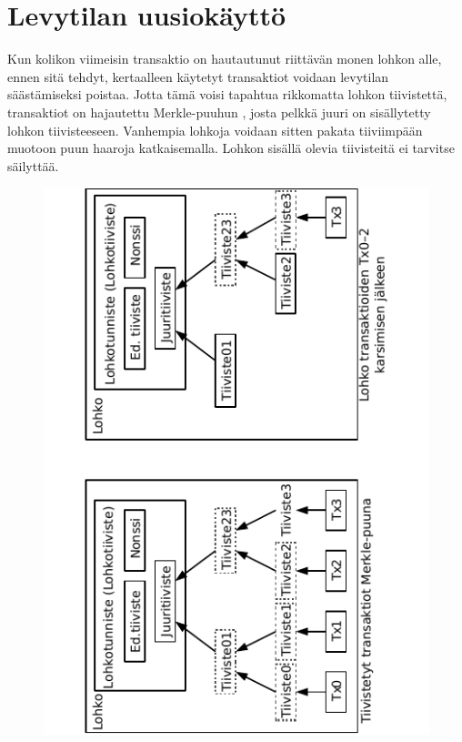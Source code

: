 \documentclass{article}
\begin{document}
\section{Levytilan uusiokäyttö}

Kun kolikon viimeisin transaktio on hautautunut riittävän monen lohkon alle, ennen sitä tehdyt, kertaalleen käytetyt transaktiot voidaan levytilan sääs\-tä\-mi\-sek\-si poistaa. Jotta tämä voisi tapahtua rikkomatta lohkon tiivistettä, transaktiot on hajautettu Merkle-puuhun \cite{7}\cite{2}\cite{5}, josta pelkkä juuri on sisällytetty lohkon tiivisteeseen. Vanhempia lohkoja voidaan sitten pakata tiiviimpään muotoon puun haaroja katkaisemalla. Lohkon sisällä olevia tiivisteitä ei tarvitse säilyttää.

\begin{figure}[H]
    \centering
    \includegraphics[angle=270,width=\textwidth]{figures/fig4.pdf}
\end{figure}
\end{document}
